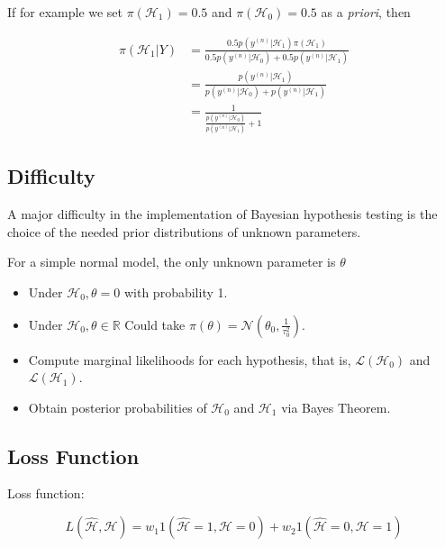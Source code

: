 \documentclass[11pt]{article}
\begin{document}
\bigskip

\noindent
If for example we set $\pi(\mathcal{H}_1) = 0.5$ and $\pi(\mathcal{H}_0) = 0.5$ as a \textit{priori}, then

\begin{align*}
    \pi(\mathcal{H}_1 | Y) &=  \frac{0.5p(y^{(n)} | \mathcal{H}_1)\pi(\mathcal{H}_1)}{0.5p(y^{(n)} | \mathcal{H}_0) + 0.5p(y^{(n)} | \mathcal{H}_1)} \\
    &= \frac{p(y^{(n)}| \mathcal{H}_1)}{p(y^{(n)}| \mathcal{H}_0) + p(y^{(n)}| \mathcal{H}_1)} \\
    &= \frac{1}{\frac{p(y^{(n)}| \mathcal{H}_0)}{p(y^{(n)}| \mathcal{H}_1)}+1}
\end{align*}

\subsection{Difficulty}

A major difficulty in the implementation of Bayesian hypothesis testing is the choice of the needed prior distributions of unknown parameters. \cite{Berger:2011fuz}

\bigskip
\noindent
For a simple normal model, the only unknown parameter is $\theta$

\begin{itemize}
    \item Under $\mathcal{H}_{0}, \theta=0$ with probability 1.
    \item Under $\mathcal{H}_{0}, \theta \in \mathbb{R}$ Could take $\pi(\theta)=\mathcal{N}(\theta_{0}, \frac{1}{\tau_{0}^{2}})$.
    \item Compute marginal likelihoods for each hypothesis, that is, $\mathcal{L}\left(\mathcal{H}_{0}\right)$ and $\mathcal{L}\left(\mathcal{H}_{1}\right)$.
    \item Obtain posterior probabilities of $\mathcal{H}_{0}$ and $\mathcal{H}_{1}$ via Bayes Theorem. 
\end{itemize}

\subsection{Loss Function}

Loss function:

\begin{equation}
    L(\hat{\mathcal{H}}, \mathcal{H})=w_{1} 1(\hat{\mathcal{H}}=1, \mathcal{H}=0)+w_{2} 1(\hat{\mathcal{H}}=0, \mathcal{H}=1)
\end{equation}
\end{document}
